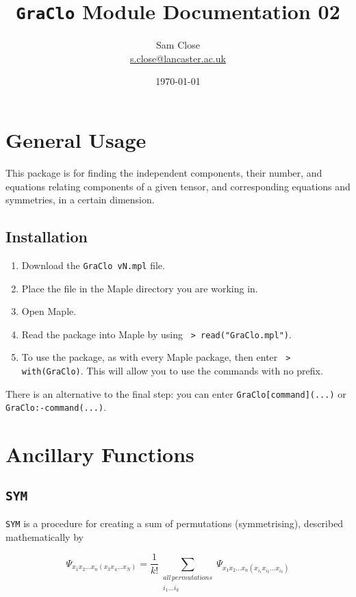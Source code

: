 \documentclass{article}
\title{\verb~GraClo~ Module Documentation 02}
\author{Sam Close \\ \href{mailto:s.close@lancaster.ac.uk}{s.close@lancaster.ac.uk}}
\date{\today}
\begin{document}
\maketitle

\section*{General Usage}

This package is for finding the independent components, their number, and equations relating components of a given tensor, and corresponding equations and symmetries, in a certain dimension.

\subsection*{Installation}
\begin{enumerate}
    \item Download the \verb~GraClo vN.mpl~ file.
    \item Place the file in the Maple directory you are working in.
    \item Open Maple.
    \item Read the package into Maple by using \verb~ > read("GraClo.mpl")~.
    \item To use the package, as with every Maple package, then enter \verb~ > with(GraClo)~. This will allow you to use the commands with no prefix.
\end{enumerate}

There is an alternative to the final step: you can enter \verb~GraClo[command](...)~ or \verb~GraClo:-command(...)~.
\section*{Ancillary Functions}

\subsection*{\verb~SYM~}

\verb~SYM~ is a procedure for creating a sum of permutations (symmetrising), described mathematically by

\begin{equation*}
    \Psi_{x_1 x_2 ... x_n (x_3 x_4 ... x_N)} = \frac{1}{k!} \sum_{\substack{all \, permutations \\ i_1 ... i_k}} \Psi_{x_1 x_2 ... x_n (x_{i_1} x_{i_2} ... x_{i_k})}
\end{equation*}
\end{document}

